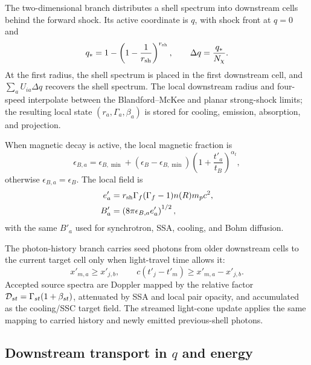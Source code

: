 \documentclass[twocolumn]{aastex702}
\begin{document}
The two-dimensional branch distributes a shell spectrum into downstream cells
behind the forward shock.  Its active coordinate is \(q\), with shock front at
\(q=0\) and
\begin{equation}
q_\ast=1-\left(1-\frac{1}{r_{\rm sh}}\right)^{r_{\rm sh}},\qquad
\Delta q=\frac{q_\ast}{N_\chi}.
\end{equation}
At the first radius, the shell spectrum is placed in the first downstream cell,
and \(\sum_aU_{ia}\Delta q\) recovers the shell spectrum.  The local downstream
radius and four-speed interpolate between the Blandford--McKee and planar
strong-shock limits; the resulting local state \((r_a,\Gamma_a,\beta_a)\) is
stored for cooling, emission, absorption, and projection.

When magnetic decay is active, the local magnetic fraction is
\begin{equation}
\epsilon_{B,a}=\epsilon_{B,\min}
+(\epsilon_B-\epsilon_{B,\min})
\left(1+\frac{t'_a}{t_B}\right)^{\alpha_t},
\end{equation}
otherwise \(\epsilon_{B,a}=\epsilon_B\).  The local field is
\begin{equation}
\begin{aligned}
e'_a&=r_{\rm sh}\Gamma_f(\Gamma_f-1)n(R)m_pc^2,\\
B'_a&=\left(8\pi\epsilon_{B,a}e'_a\right)^{1/2},
\end{aligned}
\end{equation}
with the same \(B'_a\) used for synchrotron, SSA, cooling, and Bohm diffusion.

The photon-history branch carries seed photons from older downstream cells to
the current target cell only when light-travel time allows it:
\begin{equation}
x'_{m,a}\ge x'_{j,b},\qquad
c(t'_j-t'_m)\ge x'_{m,a}-x'_{j,b}.
\end{equation}
Accepted source spectra are Doppler mapped by the relative factor
\({\cal D}_{st}=\Gamma_{st}(1+\beta_{st})\), attenuated by SSA and local pair
opacity, and accumulated as the cooling/SSC target field.  The streamed
light-cone update applies the same mapping to carried history and newly emitted
previous-shell photons.

\subsection{Downstream transport in \texorpdfstring{\(q\)}{q} and energy}
\end{document}
